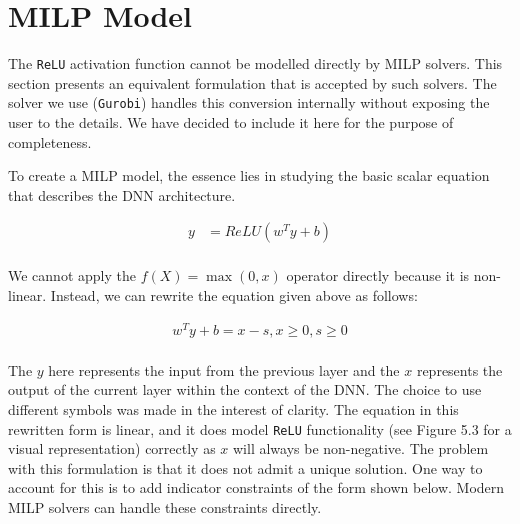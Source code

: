 \section{MILP Model}
The \texttt{ReLU} activation function cannot be modelled directly by MILP solvers. This section presents an
equivalent formulation that is accepted by such solvers. The solver we use (\texttt{Gurobi}) handles this conversion
internally without exposing the user to the details. We have decided to include it here for the purpose of completeness.

To create a \ac{MILP} model, the essence lies in studying the basic scalar equation that describes the \ac{DNN} architecture.

\begin{equation}
\begin{aligned}
y &= ReLU(w^Ty + b) \\
\end{aligned}
\end{equation}


We cannot apply the $f(X) = \max(0, x)$ operator directly because it is non-linear. Instead, we
can rewrite the equation given above as follows:

\begin{equation}
\begin{aligned}
w^Ty + b = x - s, x \geq 0, s \geq 0 \\
\end{aligned}
\end{equation}

The $y$ here represents the input from the previous layer and the $x$ represents the output of the current layer within the context of the DNN.
The choice to use different symbols was made in the interest of clarity. The equation in this rewritten form is linear, and it does model
\texttt{ReLU} functionality (see Figure 5.3 for a visual representation) correctly as $x$ will always be non-negative. The problem with this formulation
is that it does not admit a unique solution. One way to account for this is to add indicator constraints of the form shown below. Modern MILP solvers can
handle these constraints directly.



